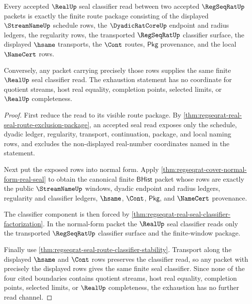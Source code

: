 \begin{theorem}
\label{thm:regseqrat-real-seal-classifier-exhaustion}
Every accepted $\RealUp$ seal classifier read between two accepted
$\RegSeqRatUp$ packets is exactly the finite route package consisting of the
displayed $\StreamNameUp$ schedule rows, the $\DyadicRatCoreUp$ endpoint and
radius ledgers, the regularity rows, the transported $\RegSeqRatUp$ classifier
surface, the displayed $\hsame$ transports, the $\Cont$ routes,
$\mathsf{Pkg}$ provenance, and the local $\NameCert$ rows.

Conversely, any packet carrying precisely those rows supplies the same finite
$\RealUp$ seal classifier read. The exhaustion statement has no coordinate for
quotient streams, host real equality, completion points, selected limits, or
$\RealUp$ completeness.
\end{theorem}
\begin{proof}
First reduce the read to its visible route package. By
\autoref{thm:regseqrat-real-seal-route-exclusion-package}, an accepted seal
read exposes only the schedule, dyadic ledger, regularity, transport,
continuation, package, and local naming rows, and excludes the non-displayed
real-number coordinates named in the statement.

Next put the exposed rows into normal form. Apply
\autoref{thm:regseqrat-cover-normal-form-real-seal} to obtain the canonical
finite $\mathsf{BHist}$ packet whose rows are exactly the public
$\StreamNameUp$ windows, dyadic endpoint and radius ledgers, regularity and
classifier ledgers, $\hsame$, $\Cont$, $\mathsf{Pkg}$, and $\NameCert$
provenance.

The classifier component is then forced by
\autoref{thm:regseqrat-real-seal-classifier-factorization}. In the normal-form
packet the $\RealUp$ seal classifier reads only the transported
$\RegSeqRatUp$ classifier surface and the finite-window package.

Finally use \autoref{thm:regseqrat-seal-route-classifier-stability}. Transport
along the displayed $\hsame$ and $\Cont$ rows preserves the classifier read, so
any packet with precisely the displayed rows gives the same finite seal
classifier. Since none of the four cited boundaries contains quotient streams,
host real equality, completion points, selected limits, or $\RealUp$
completeness, the exhaustion has no further read channel.
\end{proof}

